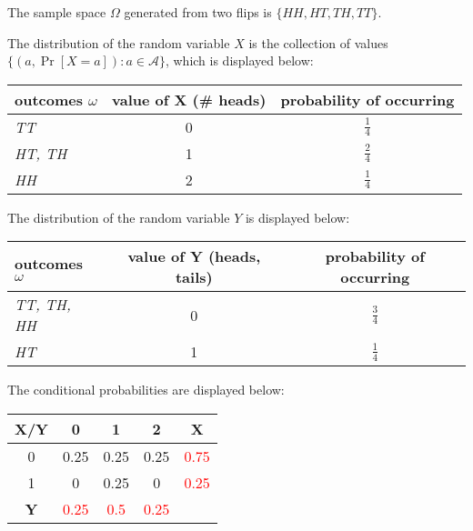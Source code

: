 \documentclass[11pt]{article}
\begin{document}
\begin{solution}

\begin{Parts}
    
\Part The sample space $\Omega$ generated from two flips is $\{HH, HT, TH, TT \}$.

\Part The distribution of the random variable $X$ is the collection of values
$\{(a, \Pr[X=a]):a \in \mathcal{A} \}$, which is displayed below:
\begin{center}
    \begin{tabular}{|>{\centering\arraybackslash}m{6cm}|c|c|}
    \hline
    \textbf{outcomes $\omega$} & \textbf{value of X (\# heads)} & 
    \textbf{probability of occurring} \\
    \hline
    \textit{TT} & 0 & $\frac{1}{4}$ \\
    \hline
    \textit{HT, TH} & 1 & $\frac{2}{4}$ \\
    \hline
    \textit{HH} & 2 & $\frac{1}{4}$ \\
    \hline
    \end{tabular}
\end{center}

\Part The distribution of the random variable $Y$ is displayed below:
\begin{center}
    \begin{tabular}{|>{\centering\arraybackslash}m{6cm}|c|c|}
    \hline
    \textbf{outcomes $\omega$} & \textbf{value of Y (heads, tails)} & 
    \textbf{probability of occurring} \\
    \hline
    \textit{TT, TH, HH} & 0 & $\frac{3}{4}$ \\
    \hline
    \textit{HT} & 1 & $\frac{1}{4}$ \\
    \hline
    \end{tabular}
\end{center}

\Part The conditional probabilities are displayed below:

\begin{center}
\renewcommand{\arraystretch}{1.5}
\setlength{\tabcolsep}{12pt}
\begin{tabular}{|c|c|c|c|c|}
    \hline
    \textbf{X/Y} & 0 & 1 & 2 & \textbf{X} \\
    \hline
    0 & 0.25 & 0.25 & 0.25 & \textcolor{red}{0.75} \\
    \hline
    1 & 0 & 0.25 & 0 & \textcolor{red}{0.25} \\
    \hline
    \textbf{Y} & \textcolor{red}{0.25} & \textcolor{red}{0.5} & \textcolor{red}{0.25} & \\
    \hline
\end{tabular}
\end{center}


\end{Parts}
\end{solution}
\end{document}
